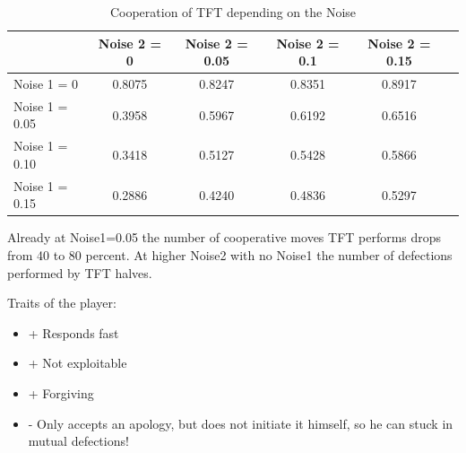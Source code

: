 \documentclass[11pt,twoside]{article}
\begin{document}
\begin{table}[h]
 \begin{center}
\caption{Cooperation of TFT depending on the Noise} \vspace{3mm}
\begin{tabular}{|l|c|c|c|c|c|}
\hline
   	& Noise 2 = 0 & Noise 2 = 0.05& Noise 2 = 0.1& Noise 2 = 0.15 \\
  \hline
  Noise 1 = 0 	& 0.8075	 &0.8247 	&0.8351	&0.8917 \\
 \hline
  Noise 1 = 0.05	 & 0.3958	&    0.5967&    0.6192 &   0.6516 \\
 \hline
  Noise 1 = 0.10 	& 0.3418 &   0.5127 &   0.5428&   0.5866 \\
 \hline
  Noise 1 = 0.15 	& 0.2886  &  0.4240 &   0.4836  &  0.5297 \\
 \hline
\end{tabular}
 \end{center}
\end{table}

Already at Noise1=0.05 the number of cooperative moves TFT performs drops from 40 to 80 percent. At higher Noise2 with no Noise1 the number of defections performed by TFT halves.

Traits of the player:

\renewcommand{\labelitemi}{}

\begin{itemize}
	\item + Responds fast
	\item + Not exploitable
	\item + Forgiving
	\item - Only accepts an apology, but does not initiate it himself, so he can stuck in mutual defections!
\end{itemize}
\renewcommand{\labelitemi}{$\bullet$}

\newpage
\end{document}
